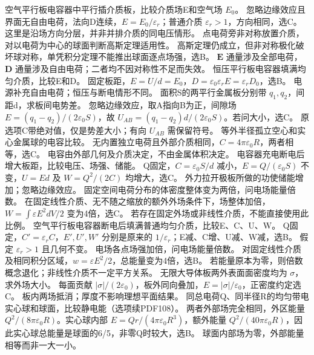 \problemtext 空气平行板电容器中平行插介质板，比较介质场E和空气场 $E_0$。
\workings 忽略边缘效应且界面无自由电荷，法向D连续，$E=E_0/\varepsilon_r$；普通介质 $\varepsilon_r>1$，方向相同，选C。
\crosscheck 这里是沿场方向分层，并非并排介质的同电压情形。
\problemtext 点电荷旁非对称放置介质，对以电荷为中心的球面判断高斯定理适用性。
\workings 高斯定理仍成立，但非对称极化破坏球对称，单凭积分定理不能推出球面逐点场强，选B。
\crosscheck $\bm E$ 通量涉及全部电荷，$\bm D$ 通量涉及自由电荷；二者均不因对称性不足而失效。
\problemtext 恒压平行板电容器填满均匀介质，比较E和D。
\workings 固定板距，$E=U/d=E_0$，$D=\varepsilon_0\varepsilon_rE=\varepsilon_rD_0$，选B。
\crosscheck 电源补充自由电荷；恒压与断电情形不同。
\problemtext 面积S的两平行金属板分别带 $q_1,q_2$，间距d，求板间电势差。
\workings 忽略边缘效应，取A指向B为正，间隙场 $E=(q_1-q_2)/(2\varepsilon_0 S)$，故 $U_{AB}=(q_1-q_2)d/(2\varepsilon_0 S)$。若问大小，选C。
\crosscheck 原选项C带绝对值，仅是势差大小；有向 $U_{AB}$ 需保留符号。
\problemtext 等外半径孤立空心和实心金属球的电容比较。
\workings 无内置独立电荷且外部介质相同，$C=4\pi\varepsilon_0R$，两者相等，选C。
\crosscheck 电容由外部几何及介质决定，不由金属体积决定。
\problemtext 电容器充电断电后增大板距，比较电压、场强、储能。
\workings Q固定，$C=\varepsilon_0S/d$ 减小，$E=Q/(\varepsilon_0S)$ 不变，$U=Ed$ 及 $W=Q^2/(2C)$ 均增大，选C。
\crosscheck 外力拉开极板所做的功使储能增加；忽略边缘效应。
\problemtext 固定空间电荷分布的体密度整体变为两倍，问电场能量倍数。
\workings 在固定线性介质、无不随之缩放的额外外场条件下，场整体加倍，$W=\int\varepsilon E^2dV/2$ 变为4倍，选C。
\crosscheck 若存在固定外场或非线性介质，不能直接使用此比例。
\problemtext 空气平行板电容器断电后填满普通均匀介质，比较E、C、U、W。
\workings Q固定，$C'=\varepsilon_rC$，$E',U',W'$ 分别是原来的 $1/\varepsilon_r$；E减、C增、U减、W减，选B。
\crosscheck 假定 $\varepsilon_r>1$ 且几何不变。
\problemtext 电场各点场强加倍，问电场能量倍数。
\workings 对固定线性介质及相同积分区域，$w=\varepsilon E^2/2$，总能量变为4倍，选B。
\crosscheck 若能量原本为零，则倍数概念退化；非线性介质不一定平方关系。
\problemtext 无限大导体板两外表面面密度均为 $\sigma$，求外场大小。
\workings 每面贡献 $|\sigma|/(2\varepsilon_0)$，板外同向叠加，$E=|\sigma|/\varepsilon_0$，正密度约定选C。
\crosscheck 板内两场抵消；厚度不影响理想平面结果。
\problemtext 同总电荷Q、同半径R的均匀带电实心球和球面，比较静电能（选项续PDF108）。
\workings 两者外部场完全相同，外区能量 $Q^2/(8\pi\varepsilon_0R)$。实心球内部 $E=Qr/(4\pi\varepsilon_0R^3)$，额外能量 $Q^2/(40\pi\varepsilon_0R)$，因此实心球总能量是球面的6/5，非零Q时较大，选B。
\crosscheck 球面内部场为零，外部能量相等而非一大一小。

